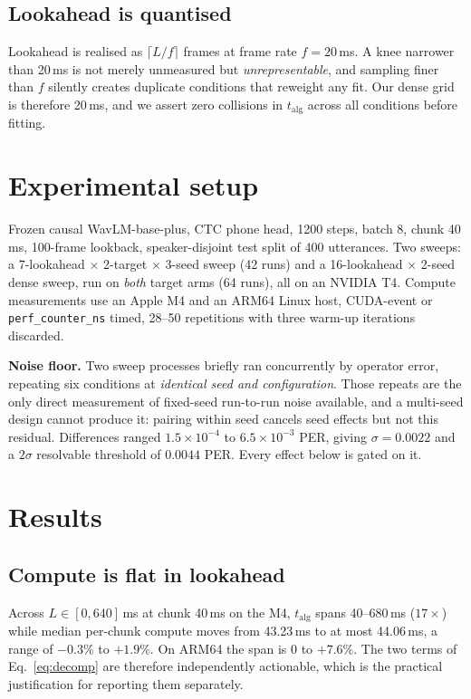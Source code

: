 \documentclass{article}
\newcommand{\talg}{\ensuremath{t_{\mathrm{alg}}}}
\begin{document}
\subsection{Lookahead is quantised}

Lookahead is realised as $\lceil L/f \rceil$ frames at frame rate $f=20$\,ms.
A knee narrower than 20\,ms is not merely unmeasured but
\emph{unrepresentable}, and sampling finer than $f$ silently creates duplicate
conditions that reweight any fit. Our dense grid is therefore 20\,ms, and we
assert zero collisions in $t_{\mathrm{alg}}$ across all conditions before
fitting.

\section{Experimental setup}

Frozen causal WavLM-base-plus, CTC phone head, 1200 steps, batch 8, chunk
40\,ms, 100-frame lookback, speaker-disjoint test split of 400 utterances.
Two sweeps: a 7-lookahead $\times$ 2-target $\times$ 3-seed sweep (42 runs)
and a 16-lookahead $\times$ 2-seed dense sweep, run on \emph{both} target arms
(64 runs), all on an NVIDIA T4. Compute measurements use an Apple M4 and an ARM64
Linux host, CUDA-event or \texttt{perf\_counter\_ns} timed, 28--50 repetitions
with three warm-up iterations discarded.

\noindent\textbf{Noise floor.} Two sweep processes briefly ran concurrently by
operator error, repeating six conditions at \emph{identical seed and
configuration}. Those repeats are the only direct measurement of fixed-seed
run-to-run noise available, and a multi-seed design cannot produce it: pairing
within seed cancels seed effects but not this residual. Differences ranged
$1.5\times10^{-4}$ to $6.5\times10^{-3}$ PER, giving $\sigma=0.0022$ and a
$2\sigma$ resolvable threshold of $\mathbf{0.0044}$ PER. Every effect below is
gated on it.

\section{Results}

\subsection{Compute is flat in lookahead}
\label{sec:compute}

Across $L\in[0,640]$\,ms at chunk 40\,ms on the M4, \talg{} spans 40--680\,ms
($17\times$) while median per-chunk compute moves from 43.23\,ms to at most
44.06\,ms, a range of $-0.3\%$ to $+1.9\%$. On ARM64 the span is $0$ to
$+7.6\%$. The two terms of Eq.~\ref{eq:decomp} are therefore independently
actionable, which is the practical justification for reporting them
separately.
\end{document}

